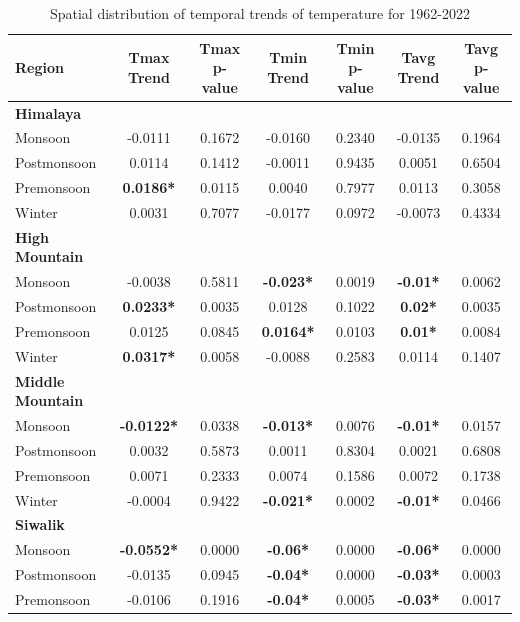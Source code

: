 \begin{table}[htbp]
  \centering
  \caption{Spatial distribution of temporal trends of temperature for 1962-2022}
  \begin{tabular}{@{}lcccccc@{}}
      \toprule
      Region & Tmax Trend & Tmax p-value & Tmin Trend & Tmin p-value & Tavg Trend & Tavg p-value \\ 
      \midrule
      \textbf{Himalaya} & & & & & & \\ 
      Monsoon & -0.0111 & 0.1672 & -0.0160 & 0.2340 & -0.0135 & 0.1964 \\ 
      Postmonsoon & 0.0114 & 0.1412 & -0.0011 & 0.9435 & 0.0051 & 0.6504 \\ 
      Premonsoon & \textbf{0.0186*} & 0.0115 & 0.0040 & 0.7977 & 0.0113 & 0.3058 \\ 
      Winter & 0.0031 & 0.7077 & -0.0177 & 0.0972 & -0.0073 & 0.4334 \\ 
      \midrule
      \textbf{High Mountain} & & & & & & \\ 
      Monsoon & -0.0038 & 0.5811 & \textbf{-0.023*} & 0.0019 & \textbf{-0.01*} & 0.0062 \\ 
      Postmonsoon & \textbf{0.0233*} & 0.0035 & 0.0128 & 0.1022 & \textbf{0.02*} & 0.0035 \\ 
      Premonsoon & 0.0125 & 0.0845 & \textbf{0.0164*} & 0.0103 & \textbf{0.01*} & 0.0084 \\ 
      Winter & \textbf{0.0317*} & 0.0058 & -0.0088 & 0.2583 & 0.0114 & 0.1407 \\ 
      \midrule
      \textbf{Middle Mountain} & & & & & & \\ 
      Monsoon & \textbf{-0.0122*} & 0.0338 & \textbf{-0.013*} & 0.0076 & \textbf{-0.01*} & 0.0157 \\ 
      Postmonsoon & 0.0032 & 0.5873 & 0.0011 & 0.8304 & 0.0021 & 0.6808 \\ 
      Premonsoon & 0.0071 & 0.2333 & 0.0074 & 0.1586 & 0.0072 & 0.1738 \\ 
      Winter & -0.0004 & 0.9422 & \textbf{-0.021*} & 0.0002 & \textbf{-0.01*} & 0.0466 \\ 
      \midrule
      \textbf{Siwalik} & & & & & & \\ 
      Monsoon & \textbf{-0.0552*} & 0.0000 & \textbf{-0.06*} & 0.0000 & \textbf{-0.06*} & 0.0000 \\ 
      Postmonsoon & -0.0135 & 0.0945 & \textbf{-0.04*} & 0.0000 & \textbf{-0.03*} & 0.0003 \\ 
      Premonsoon & -0.0106 & 0.1916 & \textbf{-0.04*} & 0.0005 & \textbf{-0.03*} & 0.0017 \\ 

\end{tabular}
\end{table}
